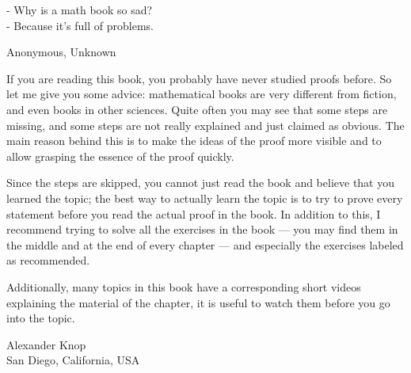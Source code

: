 \epigraph{
    - Why is a math book so sad? \\
    - Because it's full of problems.
}{Anonymous, Unknown}


If you are reading this book, you probably have never studied proofs before.
So let me give you some advice: mathematical books are very different from
fiction, and even books in other sciences. Quite often you may see that some
steps are missing, and some steps are not really explained and just claimed as
obvious. The main reason behind this is to make the ideas of the proof more
visible and to allow grasping the essence of the proof quickly.

Since the steps are skipped, you cannot just read the book and believe that you
learned the topic; the best way to actually learn the topic is to try to prove
every statement before you read the actual proof in the book. In addition to
this, I recommend trying to solve all the exercises in the book --- you may find
them in the middle and at the end of every chapter --- and especially the
exercises labeled as recommended.

Additionally, many topics in this book have a corresponding short videos
explaining the material of the chapter, it is useful to watch them before you go
into the topic.

\begin{flushright}
  Alexander Knop \\
  San Diego, California, USA
\end{flushright}
